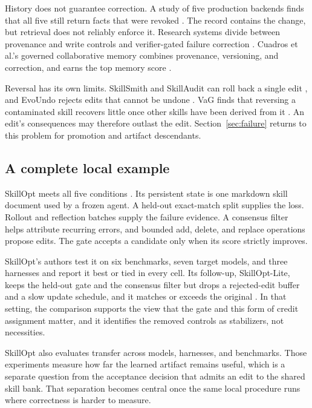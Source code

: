 History does not guarantee correction. A study of five production backends finds that all five still return facts that were revoked \cite{shen2026revoked}. The record contains the change, but retrieval does not reliably enforce it. Research systems divide between provenance and write controls \cite{wang2026toki, xu2026ppmf, margalit2026governed, sun2026vermem} and verifier-gated failure correction \cite{yu2026recuris, wang2026memguard}. Cuadros et al.'s governed collaborative memory combines provenance, versioning, and correction, and earns the top memory score \cite{cuadros2026governed}.

Reversal has its own limits. SkillSmith and SkillAudit can roll back a single edit \cite{wei2026skillsmith, gao2026skillaudit}, and EvoUndo rejects edits that cannot be undone \cite{sah2026evoundo}. VaG finds that reversing a contaminated skill recovers little once other skills have been derived from it \cite{shang2026vag}. An edit's consequences may therefore outlast the edit. Section~\ref{sec:failure} returns to this problem for promotion and artifact descendants.

\subsection{A complete local example}\label{a-complete-local-example}

SkillOpt meets all five conditions \cite{yang2026skillopt}. Its persistent state is one markdown skill document used by a frozen agent. A held-out exact-match split supplies the loss. Rollout and reflection batches supply the failure evidence. A consensus filter helps attribute recurring errors, and bounded add, delete, and replace operations propose edits. The gate accepts a candidate only when its score strictly improves.

SkillOpt's authors test it on six benchmarks, seven target models, and three harnesses and report it best or tied in every cell. Its follow-up, SkillOpt-Lite, keeps the held-out gate and the consensus filter but drops a rejected-edit buffer and a slow update schedule, and it matches or exceeds the original \cite{shen2026skilloptlite}. In that setting, the comparison supports the view that the gate and this form of credit assignment matter, and it identifies the removed controls as stabilizers, not necessities.

SkillOpt also evaluates transfer across models, harnesses, and benchmarks. Those experiments measure how far the learned artifact remains useful, which is a separate question from the acceptance decision that admits an edit to the shared skill bank. That separation becomes central once the same local procedure runs where correctness is harder to measure.

